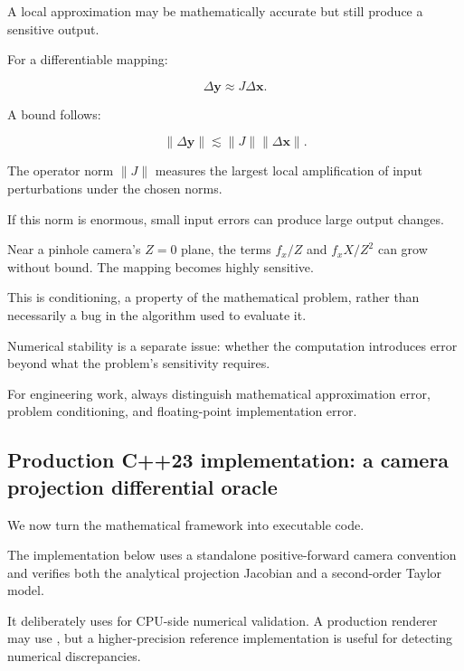 \hypertarget{02-foundations-ii-ch021-conditioning-versus-approximation-error}{}

A local approximation may be mathematically accurate but still produce a sensitive output.

For a differentiable mapping:

\[
\Delta\mathbf y\approx J\Delta\mathbf x.
\]

A bound follows:

\[
\|\Delta\mathbf y\| \lesssim \|J\|\|\Delta\mathbf x\|.
\]

The operator norm \(\|J\|\) measures the largest local amplification of input perturbations under the chosen norms.

If this norm is enormous, small input errors can produce large output changes.

Near a pinhole camera's \(Z=0\) plane, the terms \(f_x/Z\) and \(f_xX/Z^2\) can grow without bound. The mapping becomes highly sensitive.

This is conditioning, a property of the mathematical problem, rather than necessarily a bug in the algorithm used to evaluate it.

Numerical stability is a separate issue: whether the computation introduces error beyond what the problem's sensitivity requires.

For engineering work, always distinguish mathematical approximation error, problem conditioning, and floating-point implementation error.

\subsection{Production C++23 implementation: a camera projection differential oracle}\label{02-foundations-ii-ch021-production-c23-implementation-a-camera-projection-differential-oracle}

\hypertarget{02-foundations-ii-ch021-production-c23-implementation-a-camera-projection-differential-oracle}{}

We now turn the mathematical framework into executable code.

The implementation below uses a standalone positive-forward camera convention and verifies both the analytical projection Jacobian and a second-order Taylor model.

It deliberately uses  for CPU-side numerical validation. A production renderer may use , but a higher-precision reference implementation is useful for detecting numerical discrepancies.

